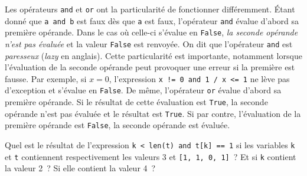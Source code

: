 \documentclass{magnoliaold}
\begin{document}
Les opérateurs \verb_and_ et \verb_or_ ont la particularité de fonctionner
différemment. Étant donné que \verb_a and b_ est faux dès que \verb_a_ est faux,
l'opérateur \verb_and_ évalue d'abord sa première opérande. Dans le cas où celle-ci
s'évalue en \verb_False_, \emph{la seconde opérande n'est pas évaluée} et la valeur \verb_False_
est renvoyée. On dit que l'opérateur \verb_and_ est \emph{paresseux} (\emph{lazy} en
anglais). Cette particularité est importante, notamment lorsque l'évaluation de la seconde
opérande peut provoquer une erreur si la première est fausse. Par exemple, si $x=0$, l'expression
\verb_x != 0 and 1 / x <= 1_ ne lève pas d'exception et s'évalue en \verb_False_.
De même, l'opérateur \verb_or_ évalue d'abord sa première opérande. Si le résultat
de cette évaluation est \verb_True_, la seconde opérande n'est pas évaluée et le
résultat est \verb_True_. Si par contre, l'évaluation de la
première opérande est \verb_False_, la seconde opérande est évaluée.
\vspace{2ex}
\begin{exoUnique}
\exo Quel est le résultat de l'expression \verb_k < len(t) and t[k] == 1_
  si les variables \verb_k_ et \verb_t_ contiennent respectivement les valeurs
	3 et \verb_[1, 1, 0, 1]_~? Et si \verb_k_ contient la valeur 2~? Si elle contient la
	valeur 4~?
\end{exoUnique}







\end{document}
